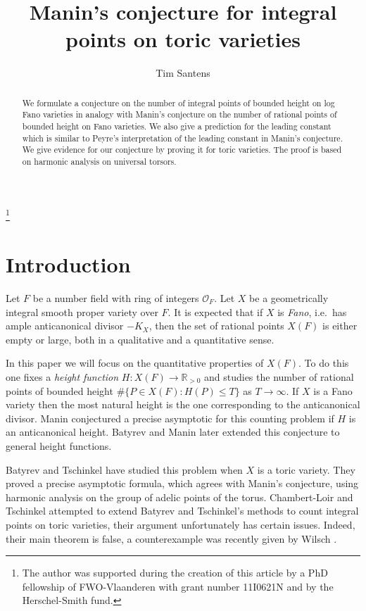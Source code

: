 \documentclass[a4paper,11pt,reqno]{amsart}
\title{Manin's conjecture for integral points on toric varieties}
\author{Tim Santens}
\newcommand{\R}{\mathbb{R}}
\theoremstyle{definition}
\begin{document}
\begin{abstract}
	We formulate a conjecture on the number of integral points of bounded height on log Fano varieties in analogy with Manin's conjecture on the number of rational points of bounded height on Fano varieties. We also give a prediction for the leading constant which is similar to Peyre's interpretation of the leading constant in Manin's conjecture. We give evidence for our conjecture by proving it for toric varieties. The proof is based on harmonic analysis on universal torsors.
\end{abstract}
\thanks{The author was supported during the creation of this article by a PhD fellowship of FWO-Vlaanderen with grant number 11I0621N and by the Herschel-Smith fund.}
\maketitle
\tableofcontents
\section{Introduction}
Let $F$ be a number field with ring of integers $\mathcal{O}_F$. Let $X$ be a geometrically integral smooth proper variety over $F$. It is expected that if $X$ is \emph{Fano}, i.e.~has ample anticanonical divisor $- K_X$, then the set of rational points $X(F)$ is either empty or large, both in a qualitative and a quantitative sense.

In this paper we will focus on the quantitative properties of $X(F)$. To do this one fixes a \emph{height function} $H: X(F) \to \R_{>0}$ and studies the number of rational points of bounded height $\# \{P \in X(F): H(P) \leq T\}$ as $T \to \infty$. If $X$ is a Fano variety then the most natural height is the one corresponding to the anticanonical divisor. Manin \cite{Manin1989Rational} conjectured a precise asymptotic for this counting problem if $H$ is an anticanonical height. Batyrev and Manin \cite{Batyrev1990Nombre} later extended this conjecture to general height functions.

Batyrev and Tschinkel \cite{Batyrev1995Rational, Batyrev1998Manin, Batyrev1996Height} have studied this problem when $X$ is a toric variety. They proved a precise asymptotic formula, which agrees with Manin's conjecture, using harmonic analysis on the group of adelic points of the torus. Chambert-Loir and Tschinkel \cite{Chambert-Loir2010Integral} attempted to extend Batyrev and Tschinkel's methods to count integral points on toric varieties, their argument unfortunately has certain issues. Indeed, their main theorem is false, a counterexample was recently given by Wilsch \cite{Wilsch2022Integral}.
\end{document}
